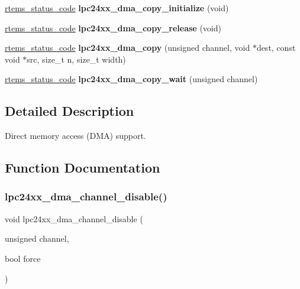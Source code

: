 \begin{DoxyCompactItemize}
\mbox{\hyperlink{group__ClassicStatus_ga545d41846817eaba6143d52ee4d9e9fe}{rtems\+\_\+status\+\_\+code}} {\bfseries lpc24xx\+\_\+dma\+\_\+copy\+\_\+initialize} (void)
\item 
\mbox{\label{group__lpc24xx__dma_gaef365f2194ed036f4a0aeb401c449815}} 
\mbox{\hyperlink{group__ClassicStatus_ga545d41846817eaba6143d52ee4d9e9fe}{rtems\+\_\+status\+\_\+code}} {\bfseries lpc24xx\+\_\+dma\+\_\+copy\+\_\+release} (void)
\item 
\mbox{\label{group__lpc24xx__dma_ga2bf28d5a990940a8ec7e5413abe255b2}} 
\mbox{\hyperlink{group__ClassicStatus_ga545d41846817eaba6143d52ee4d9e9fe}{rtems\+\_\+status\+\_\+code}} {\bfseries lpc24xx\+\_\+dma\+\_\+copy} (unsigned channel, void $\ast$dest, const void $\ast$src, size\+\_\+t n, size\+\_\+t width)
\item 
\mbox{\label{group__lpc24xx__dma_gaad17ce0259ff3426c5406e5f4b9450e3}} 
\mbox{\hyperlink{group__ClassicStatus_ga545d41846817eaba6143d52ee4d9e9fe}{rtems\+\_\+status\+\_\+code}} {\bfseries lpc24xx\+\_\+dma\+\_\+copy\+\_\+wait} (unsigned channel)
\end{DoxyCompactItemize}


\subsection{Detailed Description}
Direct memory access (D\+MA) support. 



\subsection{Function Documentation}
\mbox{\label{group__lpc24xx__dma_gad05876855d5c4234f5ee01b55be3f0d1}} 
\subsubsection{\texorpdfstring{lpc24xx\_dma\_channel\_disable()}{lpc24xx\_dma\_channel\_disable()}}
{\footnotesize\ttfamily void lpc24xx\+\_\+dma\+\_\+channel\+\_\+disable (\begin{DoxyParamCaption}\item[{unsigned}]{channel,  }\item[{bool}]{force }\end{DoxyParamCaption})}



